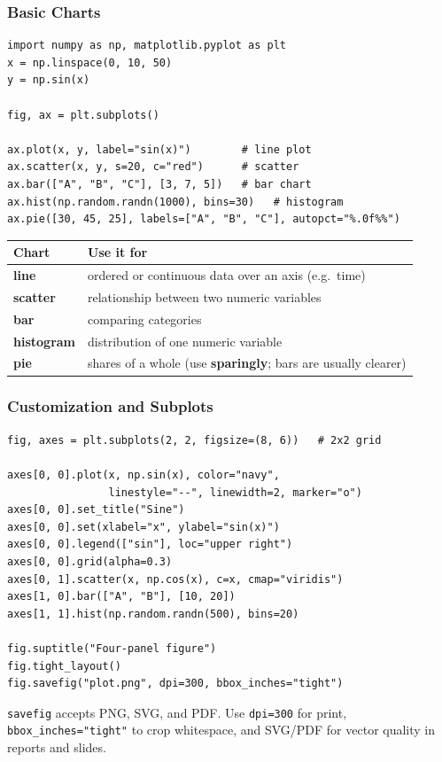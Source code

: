 \documentclass[aspectratio=169,10pt]{beamer}
\newcommand{\keyword}[1]{\textcolor{PrimaryBlue}{\textbf{#1}}}
\newcommand{\codeword}[1]{\texttt{#1}}
\begin{document}
\begin{frame}[fragile]
\frametitle{Basic Charts}
\small
\begin{lstlisting}[style=pycode]
import numpy as np, matplotlib.pyplot as plt
x = np.linspace(0, 10, 50)
y = np.sin(x)

fig, ax = plt.subplots()

ax.plot(x, y, label="sin(x)")        # line plot
ax.scatter(x, y, s=20, c="red")      # scatter
ax.bar(["A", "B", "C"], [3, 7, 5])   # bar chart
ax.hist(np.random.randn(1000), bins=30)   # histogram
ax.pie([30, 45, 25], labels=["A", "B", "C"], autopct="%.0f%%")
\end{lstlisting}

\renewcommand{\arraystretch}{1.20}
\begin{tabularx}{\linewidth}{>{\bfseries}p{2.0cm}X}
\toprule
Chart & Use it for \\
\midrule
line       & ordered or continuous data over an axis (e.g.\ time) \\
scatter    & relationship between two numeric variables \\
bar        & comparing categories \\
histogram  & distribution of one numeric variable \\
pie        & shares of a whole (use \keyword{sparingly}; bars are usually clearer) \\
\bottomrule
\end{tabularx}
\end{frame}


\begin{frame}[fragile]
\frametitle{Customization and Subplots}
\small
\begin{lstlisting}[style=pycode]
fig, axes = plt.subplots(2, 2, figsize=(8, 6))   # 2x2 grid

axes[0, 0].plot(x, np.sin(x), color="navy",
                linestyle="--", linewidth=2, marker="o")
axes[0, 0].set_title("Sine")
axes[0, 0].set(xlabel="x", ylabel="sin(x)")
axes[0, 0].legend(["sin"], loc="upper right")
axes[0, 0].grid(alpha=0.3)
axes[0, 1].scatter(x, np.cos(x), c=x, cmap="viridis")
axes[1, 0].bar(["A", "B"], [10, 20])
axes[1, 1].hist(np.random.randn(500), bins=20)

fig.suptitle("Four-panel figure")
fig.tight_layout()
fig.savefig("plot.png", dpi=300, bbox_inches="tight")
\end{lstlisting}

\begin{tcolorbox}[lecturebox,title=Saving figures]
\codeword{savefig} accepts PNG, SVG, and PDF. Use \codeword{dpi=300} for print, \codeword{bbox\_inches="tight"} to crop whitespace, and SVG/PDF for vector quality in reports and slides.
\end{tcolorbox}
\end{frame}
\end{document}
